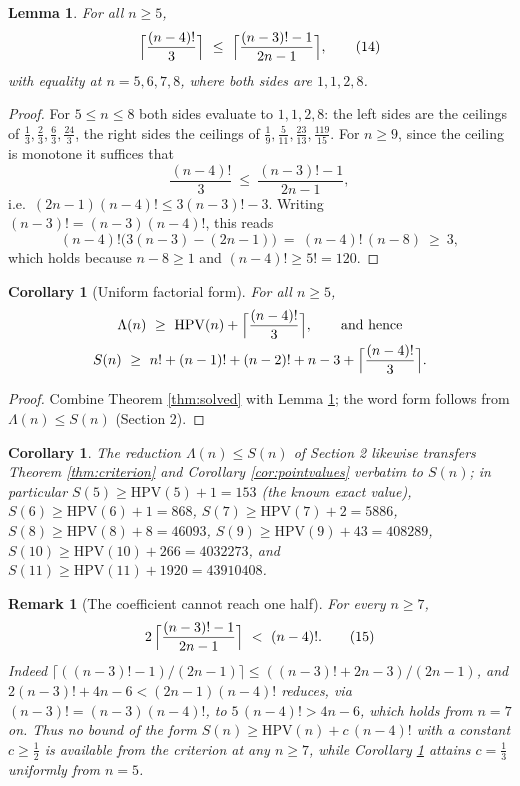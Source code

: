 \documentclass[11pt]{article}
\newtheorem{lemma}[theorem]{Lemma}
\newtheorem{corollary}[theorem]{Corollary}
\newtheorem{remark}[theorem]{Remark}
\newcommand{\HPV}{\mathrm{HPV}}
\begin{document}
\begin{lemma}\label{lem:third}
For all \(n\ge 5\),
\[
  \Bigl\lceil\frac{(n-4)!}{3}\Bigr\rceil\ \le\
  \Bigl\lceil\frac{(n-3)!-1}{2n-1}\Bigr\rceil, \tag{14}
\]
with equality at \(n=5,6,7,8\), where both sides are \(1,1,2,8\).
\end{lemma}

\begin{proof}
For \(5\le n\le 8\) both sides evaluate to \(1,1,2,8\): the left sides are the
ceilings of \(\tfrac13,\tfrac23,\tfrac63,\tfrac{24}{3}\), the right sides the ceilings
of \(\tfrac19,\tfrac{5}{11},\tfrac{23}{13},\tfrac{119}{15}\).
For \(n\ge 9\), since the ceiling is monotone it suffices that
\[
  \frac{(n-4)!}{3}\ \le\ \frac{(n-3)!-1}{2n-1},
\]
i.e.\ \((2n-1)(n-4)!\le 3(n-3)!-3\).  Writing \((n-3)!=(n-3)(n-4)!\), this reads
\[
  (n-4)!\bigl(3(n-3)-(2n-1)\bigr)\ =\ (n-4)!\,(n-8)\ \ge\ 3,
\]
which holds because \(n-8\ge1\) and \((n-4)!\ge 5!=120\).
\end{proof}

\begin{corollary}[Uniform factorial form]\label{cor:third}
For all \(n\ge 5\),
\begin{gather*}
  \Lambda(n)\ \ge\ \HPV(n)+\Bigl\lceil\frac{(n-4)!}{3}\Bigr\rceil,
  \qquad\text{and hence}\\
  S(n)\ \ge\ n!+(n-1)!+(n-2)!+n-3+\Bigl\lceil\frac{(n-4)!}{3}\Bigr\rceil .
\end{gather*}
\end{corollary}

\begin{proof}
Combine Theorem \ref{thm:solved} with Lemma \ref{lem:third}; the word form follows from
\(\Lambda(n)\le S(n)\) (Section 2).
\end{proof}

\begin{corollary}\label{cor:words}
The reduction \(\Lambda(n)\le S(n)\) of Section 2 likewise transfers Theorem
\ref{thm:criterion} and Corollary \ref{cor:pointvalues} verbatim to \(S(n)\); in
particular \(S(5)\ge\HPV(5)+1=153\)
(the known exact value), \(S(6)\ge\HPV(6)+1=868\), \(S(7)\ge\HPV(7)+2=5886\), \(S(8)\ge\HPV(8)+8=46093\),
\(S(9)\ge\HPV(9)+43=408289\), \(S(10)\ge\HPV(10)+266=4032273\), and
\(S(11)\ge\HPV(11)+1920=43910408\).
\end{corollary}

\begin{remark}[The coefficient cannot reach one half]\label{rem:half}
For every \(n\ge 7\),
\[
  2\,\Bigl\lceil\frac{(n-3)!-1}{2n-1}\Bigr\rceil\ <\ (n-4)! . \tag{15}
\]
Indeed \(\lceil((n-3)!-1)/(2n-1)\rceil\le((n-3)!+2n-3)/(2n-1)\), and
\(2(n-3)!+4n-6<(2n-1)(n-4)!\) reduces, via \((n-3)!=(n-3)(n-4)!\), to
\(5\,(n-4)!>4n-6\), which holds from \(n=7\) on.  Thus no bound of the form
\(S(n)\ge\HPV(n)+c\,(n-4)!\) with a constant \(c\ge\tfrac12\) is available from the
criterion at any \(n\ge7\), while Corollary \ref{cor:third} attains \(c=\tfrac13\)
uniformly from \(n=5\).
\end{remark}
\end{document}
